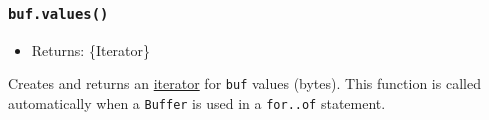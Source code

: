 \subsubsection{\texorpdfstring{\texttt{buf.values()}}{buf.values()}}\label{buf.values}

\begin{itemize}
\tightlist
\item
  Returns: \{Iterator\}
\end{itemize}

Creates and returns an
\href{https://developer.mozilla.org/en-US/docs/Web/JavaScript/Reference/Iteration_protocols}{iterator}
for \texttt{buf} values (bytes). This function is called automatically
when a \texttt{Buffer} is used in a \texttt{for..of} statement.

\begin{Shaded}
\begin{Highlighting}[]
\NormalTok{ \{ }\NormalTok{ \} } \OperatorTok{;}

\OperatorTok{=} \NormalTok{(}\NormalTok{)}\OperatorTok{;}

\NormalTok{ (}\NormalTok{()) \{}
  \OperatorTok{;}
\NormalTok{\}}

\NormalTok{ (}
  \OperatorTok{;}
\NormalTok{\}}
\end{Highlighting}
\end{Shaded}

